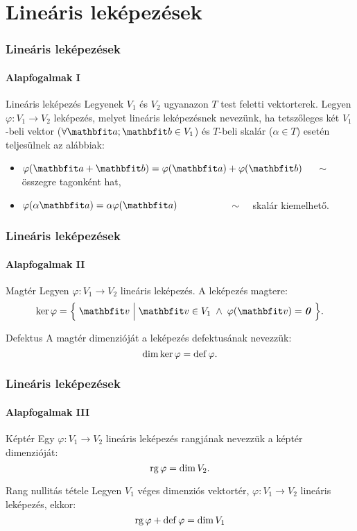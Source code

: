 \section{Lineáris leképezések}
\begin{frame}
  \frametitle{Lineáris leképezések}
  \framesubtitle{Alapfogalmak I}

  \begin{block}{Lineáris leképezés}
    Legyenek $V_1$ és $V_2$ ugyanazon $T$ test feletti vektorterek. Legyen
    $\varphi: V_1 \rightarrow V_2$ leképezés, melyet lineáris leképezésnek
    nevezünk, ha tetszőleges két $V_1$-beli vektor ($\forall \rvec a; \rvec b \in
      V_1$) és $T$-beli skalár ($\alpha \in T$) esetén teljesülnek az alábbiak:
    \begin{itemize}
      \item $\varphi(\rvec a + \rvec b) = \varphi(\rvec a) + \varphi(\rvec b)$
            $\quad \sim \quad$ összegre tagonként hat,
      \item $\varphi(\alpha \rvec a) = \alpha \varphi(\rvec a)$
            $\hspace{18mm} \sim \quad$ skalár kiemelhető.
    \end{itemize}
  \end{block}
\end{frame}

\begin{frame}
  \frametitle{Lineáris leképezések}
  \framesubtitle{Alapfogalmak II}

  \vfill
  \begin{block}{Magtér}
    Legyen $\varphi: V_1 \rightarrow V_2$ lineáris leképezés. A leképezés
    magtere:
    \[
      \ker \varphi = \Big\{\;
      \rvec v \;\Big|\; \rvec v \in V_1 \;\land\;
      \varphi(\rvec v) = \nvec
      \;\Big\}
      \text.
    \]
  \end{block}
  \vfill
  \begin{block}{Defektus}
    A magtér dimenzióját a leképezés defektusának nevezzük:
    \[
      \operatorname{dim} \ker \varphi = \operatorname{def} \varphi
      \text.
    \]
  \end{block}
  \vfill
\end{frame}

\begin{frame}
  \frametitle{Lineáris leképezések}
  \framesubtitle{Alapfogalmak III}

  \vfill
  \begin{block}{Képtér}
    Egy $\varphi: V_1 \rightarrow V_2$ lineáris leképezés rangjának nevezzük
    a képtér dimenzióját:
    \[
      \operatorname{rg} \varphi = \operatorname{dim} V_2
      \text.
    \]
  \end{block}
  \vfill
  \begin{block}{Rang nullitás tétele}
    Legyen $V_1$ véges dimenziós vektortér, $\varphi: V_1 \rightarrow V_2$
    lineáris leképezés, ekkor:
    \[
      \operatorname{rg} \varphi + \operatorname{def} \varphi = \operatorname{dim} V_1
    \]
  \end{block}
  \vfill
\end{frame}

